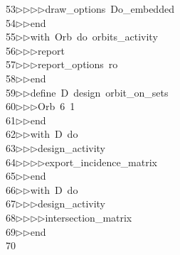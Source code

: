 \begin{tabbing}
53\>$\triangleright$\>$\triangleright$\>$\triangleright$\>$\triangleright$\>draw\_options\ Do\_embedded\ \\[0pt]
54\>$\triangleright$\>$\triangleright$\>end\ \\[0pt]
55\>$\triangleright$\>$\triangleright$\>with\ Orb\ do\ orbits\_activity\ \\[0pt]
56\>$\triangleright$\>$\triangleright$\>$\triangleright$\>report\ \ \\[0pt]
57\>$\triangleright$\>$\triangleright$\>$\triangleright$\>report\_options\ ro\ \\[0pt]
58\>$\triangleright$\>$\triangleright$\>end\ \\[0pt]
59\>$\triangleright$\>$\triangleright$\>define\ D\ design\ orbit\_on\_sets\ \\[0pt]
60\>$\triangleright$\>$\triangleright$\>$\triangleright$\>Orb\ 6\ 1\ \\[0pt]
61\>$\triangleright$\>$\triangleright$\>end\ \\[0pt]
62\>$\triangleright$\>$\triangleright$\>with\ D\ do\ \\[0pt]
63\>$\triangleright$\>$\triangleright$\>$\triangleright$\>design\_activity\ \\[0pt]
64\>$\triangleright$\>$\triangleright$\>$\triangleright$\>$\triangleright$\>export\_incidence\_matrix\ \\[0pt]
65\>$\triangleright$\>$\triangleright$\>end\ \\[0pt]
66\>$\triangleright$\>$\triangleright$\>with\ D\ do\ \\[0pt]
67\>$\triangleright$\>$\triangleright$\>$\triangleright$\>design\_activity\ \\[0pt]
68\>$\triangleright$\>$\triangleright$\>$\triangleright$\>$\triangleright$\>intersection\_matrix\ \\[0pt]
69\>$\triangleright$\>$\triangleright$\>end\\[0pt]
70\>\end{tabbing}
